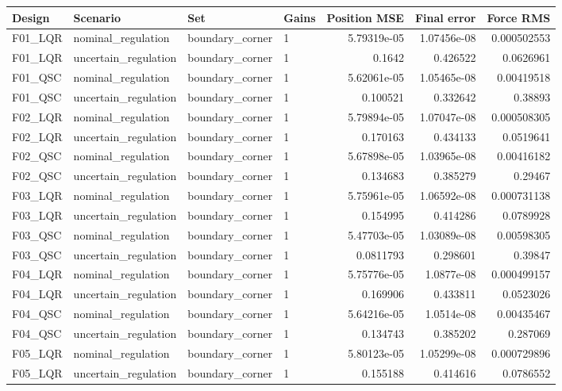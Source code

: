 \begin{tabular}{llllrrr}
\hline
Design & Scenario & Set & Gains & Position MSE & Final error & Force RMS \\
\hline
F01\_LQR & nominal\_regulation & boundary\_corner & 1 & 5.79319e-05 & 1.07456e-08 & 0.000502553 \\
F01\_LQR & uncertain\_regulation & boundary\_corner & 1 & 0.1642 & 0.426522 & 0.0626961 \\
F01\_QSC & nominal\_regulation & boundary\_corner & 1 & 5.62061e-05 & 1.05465e-08 & 0.00419518 \\
F01\_QSC & uncertain\_regulation & boundary\_corner & 1 & 0.100521 & 0.332642 & 0.38893 \\
F02\_LQR & nominal\_regulation & boundary\_corner & 1 & 5.79894e-05 & 1.07047e-08 & 0.000508305 \\
F02\_LQR & uncertain\_regulation & boundary\_corner & 1 & 0.170163 & 0.434133 & 0.0519641 \\
F02\_QSC & nominal\_regulation & boundary\_corner & 1 & 5.67898e-05 & 1.03965e-08 & 0.00416182 \\
F02\_QSC & uncertain\_regulation & boundary\_corner & 1 & 0.134683 & 0.385279 & 0.29467 \\
F03\_LQR & nominal\_regulation & boundary\_corner & 1 & 5.75961e-05 & 1.06592e-08 & 0.000731138 \\
F03\_LQR & uncertain\_regulation & boundary\_corner & 1 & 0.154995 & 0.414286 & 0.0789928 \\
F03\_QSC & nominal\_regulation & boundary\_corner & 1 & 5.47703e-05 & 1.03089e-08 & 0.00598305 \\
F03\_QSC & uncertain\_regulation & boundary\_corner & 1 & 0.0811793 & 0.298601 & 0.39847 \\
F04\_LQR & nominal\_regulation & boundary\_corner & 1 & 5.75776e-05 & 1.0877e-08 & 0.000499157 \\
F04\_LQR & uncertain\_regulation & boundary\_corner & 1 & 0.169906 & 0.433811 & 0.0523026 \\
F04\_QSC & nominal\_regulation & boundary\_corner & 1 & 5.64216e-05 & 1.0514e-08 & 0.00435467 \\
F04\_QSC & uncertain\_regulation & boundary\_corner & 1 & 0.134743 & 0.385202 & 0.287069 \\
F05\_LQR & nominal\_regulation & boundary\_corner & 1 & 5.80123e-05 & 1.05299e-08 & 0.000729896 \\
F05\_LQR & uncertain\_regulation & boundary\_corner & 1 & 0.155188 & 0.414616 & 0.0786552 \\

\end{tabular}
